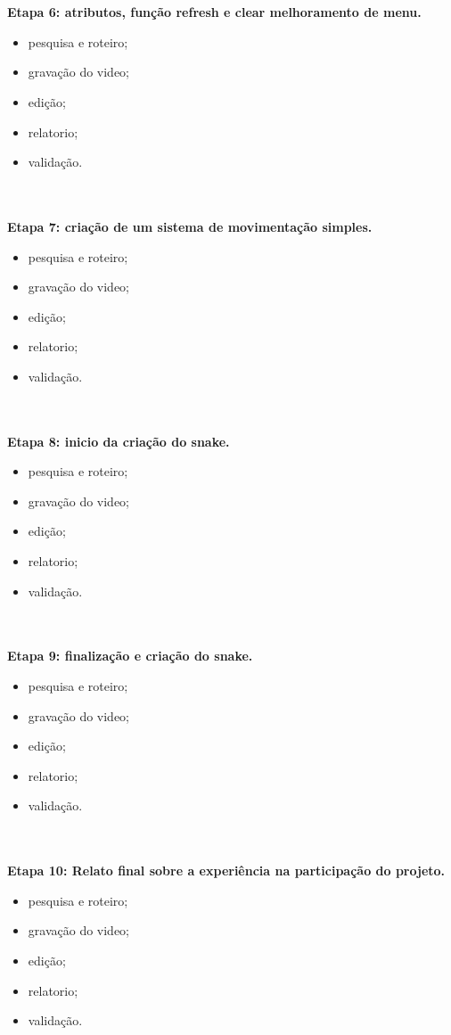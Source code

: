 \documentclass[a4paper,10pt]{article} %
\begin{document}
\\
\\
\textbf{Etapa 6: atributos, função refresh e clear melhoramento de menu.}
 \begin{itemize}
  \item pesquisa e roteiro;
  \item gravação do video;
  \item  edição;
  \item relatorio;
  \item  validação.
\end{itemize}
\\
\\
\textbf{Etapa 7: criação de um sistema de movimentação simples.}
 \begin{itemize}
  \item pesquisa e roteiro;
  \item gravação do video;
  \item  edição;
  \item relatorio;
  \item  validação.
\end{itemize}
\\
\\
\textbf{Etapa 8: inicio da criação do snake.}
 \begin{itemize}
  \item pesquisa e roteiro;
  \item gravação do video;
  \item  edição;
  \item relatorio;
  \item  validação.
\end{itemize}
\\
\\
\textbf{Etapa 9: finalização e criação do snake.}
 \begin{itemize}
  \item pesquisa e roteiro;
  \item gravação do video;
  \item  edição;
  \item relatorio;
  \item  validação.
\end{itemize}
\\
\\
\textbf{Etapa 10: Relato final sobre a experiência na participação do projeto.}
 \begin{itemize}
  \item pesquisa e roteiro;
  \item gravação do video;
  \item  edição;
  \item relatorio;
  \item  validação.
\end{itemize}
\\
\\
\end{document}
